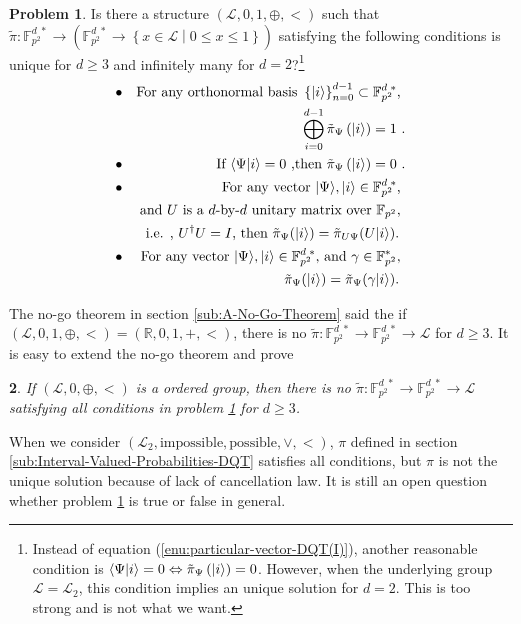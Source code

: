 \documentclass[english,12pt]{iopart}
\theoremstyle{plain}
\newtheorem{thm}{\protect\theoremname}
\theoremstyle{definition}
\newtheorem{problem}[thm]{Problem}
\newcommand{\braket}[2]{\langle{#1}|{#2}\rangle}
\newcommand{\ff}[1]{\mathbb{F}_{#1}}
\newcommand{\ffzd}[1]{{\mathbb{F}^{d\;*}_{#1}}}
\newcommand{\dpr}{{\pi}}
\providecommand{\theoremname}{Theorem}
\begin{document}
\begin{problem}
\label{prob:Gleason's}Is there a structure $\left(\mathscr{L},0,1,\oplus,<\right)$
such that $\tilde{\pi}:\ffzd{p^{2}}\rightarrow\left(\ffzd{p^{2}}\rightarrow\left\{ x\in\mathscr{L}\middle|0\le x\le1\right\} \right)$
satisfying the following conditions is unique for $d\ge3$ and infinitely
many for $d=2$?\footnote{Instead of equation (\ref{enu:particular-vector-DQT(I)}), another
reasonable condition is $\braket{\Psi}{i}=0\Leftrightarrow\tilde{\pi}_{\Psi}\left(\ket{i}\right)=0$.
However, when the underlying group $\mathscr{L}=\mathscr{L}_{2}$,
this condition implies an unique solution for $d=2$. This is too
strong and is not what we want. } 
\begin{eqnarray}
 & \bullet & \textrm{For any orthonormal basis }\left\{ \ket{i}\right\} _{n=0}^{d-1}\subset\ffzd{p^{2}}\textrm{, }\label{enu:total-probability-DQT(I)}\\
 &  & \textrm{ \ensuremath{{\displaystyle \bigoplus_{i=0}^{d-1}\tilde{\pi}_{\Psi}\left(\ket{i}\right)=1}} .}\nonumber \\
 & \bullet & \textrm{If }\braket{\Psi}{i}=0\textrm{ ,}\textrm{then }\tilde{\pi}_{\Psi}\left(\ket{i}\right)=0\textrm{ .}\label{enu:particular-vector-DQT(I)}\\
 & \bullet & \textrm{For any vector }\ket{\Psi},\ket{i}\in\ffzd{p^{2}}\textrm{, }\nonumber \\
 &  & \textrm{and }U\textrm{ is a }d\textrm{-by-}d\textrm{ unitary matrix over }\ff{p^{2}}\textrm{, }\label{enu:unitary-DQT(I)}\\
 &  & \textrm{i.e. , }U^{\dagger}U=I\textrm{, then }\tilde{\pi}_{\Psi}(\ket{i})=\tilde{\pi}_{U\Psi}(U\ket{i})\textrm{. }\nonumber \\
 & \bullet & \textrm{For any vector }\ket{\Psi},\ket{i}\in\ffzd{p^{2}}\textrm{, and }\gamma\in\ff{p^{2}}^{*}\textrm{, }\nonumber \\
 &  & \tilde{\pi}_{\Psi}(\ket{i})=\tilde{\pi}_{\Psi}(\gamma\ket{i})\textrm{. }\label{enu:parallel-DQT(I)}
\end{eqnarray}

\end{problem}
The no-go theorem in section \ref{sub:A-No-Go-Theorem} said the if
$\left(\mathscr{L},0,1,\oplus,<\right)=\left(\mathbb{R},0,1,+,<\right)$,
there is no $\tilde{\pi}:\ffzd{p^{2}}\rightarrow\ffzd{p^{2}}\rightarrow\mathscr{L}$
for $d\ge3$. It is easy to extend the no-go theorem and prove 
\begin{thm}
If $\left(\mathscr{L},0,\oplus,<\right)$ is a ordered group, then
there is no $\tilde{\pi}:\ffzd{p^{2}}\rightarrow\ffzd{p^{2}}\rightarrow\mathscr{L}$
satisfying all conditions in problem \ref{prob:Gleason's} for $d\ge3$.
\end{thm}
When we consider $\left(\mathscr{L}_{2},\text{impossible},\text{possible},\vee,<\right)$,
$\dpr$ defined in section \ref{sub:Interval-Valued-Probabilities-DQT}
satisfies all conditions, but $\dpr$ is not the unique solution because
of lack of cancellation law. It is still an open question whether
problem \ref{prob:Gleason's} is true or false in general.
\end{document}
